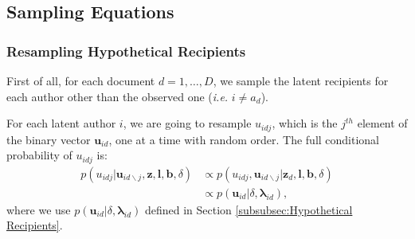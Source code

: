 \documentclass[twoside]{article}
\begin{document}
  	 \subsection{Sampling Equations}\label{subsec:Sampling Equations}
  	  \subsubsection{Resampling Hypothetical Recipients} \label{subsubsec: Resampling Hypothetical Recipients}
  	  First of all, for each document $d=1,\ldots, D$, we sample the latent recipients for each author other than the observed one (\textit{i.e.} $i \neq a_d$). 
  	  
  	  For each latent author $i$, we are going to resample $u_{idj}$, which is the $j^{th}$ element of the binary vector $\boldsymbol{u}_{id}$, one at a time with random order. The full conditional probability of $u_{idj}$ is:
  	  \begin{equation*}
  	  \begin{aligned}
  	  p(u_{idj}|\boldsymbol{u}_{id\backslash j},  \boldsymbol{z},\boldsymbol{l},\boldsymbol{b}, \delta)&\propto p(u_{idj}, \boldsymbol{u}_{id\backslash j}|\boldsymbol{z}_d,\boldsymbol{l},\boldsymbol{b}, \delta)
  	  \\&\propto p(\boldsymbol{u}_{id}|\delta, \boldsymbol{\lambda}_{id}),
  	  \end{aligned}
  	  \label{eqn:latentreceiver}
  	  \end{equation*}
  	  where we use $p(\boldsymbol{u}_{id}|\delta, \boldsymbol{\lambda}_{id})$ defined in Section \ref{subsubsec:Hypothetical Recipients}.
  	  
\end{document}

